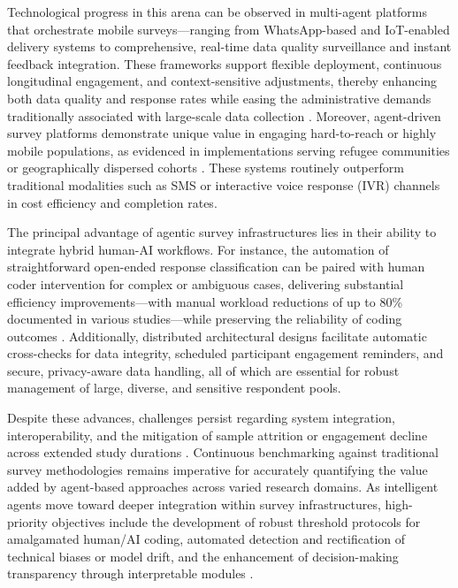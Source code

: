 Technological progress in this arena can be observed in multi-agent platforms that orchestrate mobile surveys—ranging from WhatsApp-based and IoT-enabled delivery systems to comprehensive, real-time data quality surveillance and instant feedback integration. These frameworks support flexible deployment, continuous longitudinal engagement, and context-sensitive adjustments, thereby enhancing both data quality and response rates while easing the administrative demands traditionally associated with large-scale data collection \cite{ref112}\cite{ref113}. Moreover, agent-driven survey platforms demonstrate unique value in engaging hard-to-reach or highly mobile populations, as evidenced in implementations serving refugee communities or geographically dispersed cohorts \cite{ref117}. These systems routinely outperform traditional modalities such as SMS or interactive voice response (IVR) channels in cost efficiency and completion rates.

The principal advantage of agentic survey infrastructures lies in their ability to integrate hybrid human-AI workflows. For instance, the automation of straightforward open-ended response classification can be paired with human coder intervention for complex or ambiguous cases, delivering substantial efficiency improvements—with manual workload reductions of up to 80\% documented in various studies—while preserving the reliability of coding outcomes \cite{ref112}\cite{ref113}. Additionally, distributed architectural designs facilitate automatic cross-checks for data integrity, scheduled participant engagement reminders, and secure, privacy-aware data handling, all of which are essential for robust management of large, diverse, and sensitive respondent pools.

Despite these advances, challenges persist regarding system integration, interoperability, and the mitigation of sample attrition or engagement decline across extended study durations \cite{ref117}. Continuous benchmarking against traditional survey methodologies remains imperative for accurately quantifying the value added by agent-based approaches across varied research domains. As intelligent agents move toward deeper integration within survey infrastructures, high-priority objectives include the development of robust threshold protocols for amalgamated human/AI coding, automated detection and rectification of technical biases or model drift, and the enhancement of decision-making transparency through interpretable modules \cite{ref104}\cite{ref113}.

